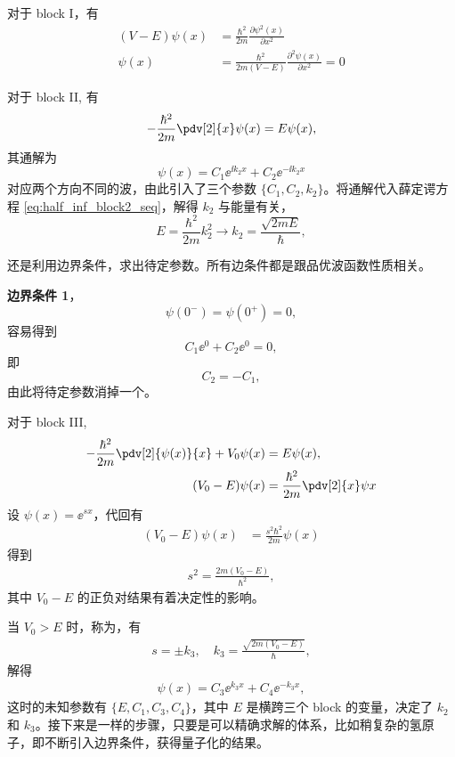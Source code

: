 对于 block I，有
\begin{align}
    (V - E)\psi(x) &= \frac{\hbar^2}{2m} \frac{\partial \psi^2(x)}{\partial x^2} \\
    \psi(x) &= \frac{\hbar^2}{2m(V - E)} \frac{\partial^2 \psi(x)}{\partial x^2} = 0
\end{align}

对于 block II, 有
\begin{align}
    -\frac{\hbar^2}{2m} \pdv[2]{x} \psi(x) = E\psi(x),
    \label{eq:half_inf_block2_seq}
\end{align}
其通解为
\begin{equation}
    \psi(x) = C_1 \ee^{\ii k_{2}x} + C_2 \ee^{-\ii k_2 x}
\end{equation}
对应两个方向不同的波，由此引入了三个参数 $\{C_1, C_2, k_2\}$。将通解代入薛定谔方程 \eqref{eq:half_inf_block2_seq}，解得 $k_2$ 与能量有关，
\begin{equation}
    E = \frac{\hbar^2}{2m} k_2^2 \rightarrow k_2 = \frac{\sqrt{2mE}}{\hbar},
\end{equation}

还是利用边界条件，求出待定参数。所有边条件都是跟品优波函数性质相关。

\textbf{边界条件 1}，
\begin{equation}
    \psi(0^-) = \psi(0^+) = 0,
\end{equation}
容易得到
\begin{equation}
    C_1 \ee^0 + C_2 \ee^0 = 0,
\end{equation}
即
\begin{equation}
    C_2 = - C_1,
\end{equation}
由此将待定参数消掉一个。

对于 block III,
\begin{align}
    - \frac{\hbar^2}{2m} \pdv[2]{\psi(x)}{x} + V_0 \psi(x) &= E\psi(x), \\
    (V_0 - E) \psi(x)&= \frac{\hbar^2}{2m} \pdv[2]{x} \psi{x}
\end{align}
设 $\psi(x) = \ee^{sx}$，代回有
\begin{align}
    (V_0-E) \psi(x) &= \frac{s^2\hbar^2}{2m} \psi(x)
\end{align}
得到
\begin{eqnarray}
    s^2 = \frac{2m(V_0 - E)}{\hbar^2},
\end{eqnarray}
其中 $V_0 - E$ 的正负对结果有着决定性的影响。

当 $V_0 > E$ 时，称为，有
\begin{eqnarray}
    s = \pm k_3, \quad k_3 = \frac{\sqrt{2m(V_0 - E)}}{\hbar}, 
\end{eqnarray}
解得
\begin{eqnarray}
    \psi(x) = C_3 \ee^{k_3 x} + C_4 \ee^{-k_3 x},
    \label{eq:half_inf_block3_wf1}
\end{eqnarray}
这时的未知参数有 $\{E, C_1, C_3, C_4\}$，其中 $E$ 是横跨三个 block 的变量，决定了 $k_2$ 和 $k_3$。接下来是一样的步骤，只要是可以精确求解的体系，比如稍复杂的氢原子，即不断引入边界条件，获得量子化的结果。

